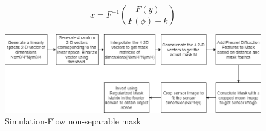 \begin{equation}
\label{eq:conv5}
x = F^{-1}(\frac{F(y)}{F(\phi)+k})
\end{equation}
\begin{figure}[ht]
\includegraphics[scale = 0.50]{pics/non_sep_sim_flow}
\caption{Simulation-Flow non-separable mask}
\label{fig:non_sep_sim}
\end{figure}

